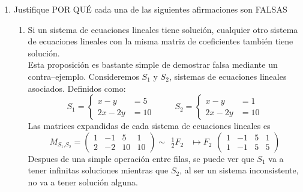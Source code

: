 \documentclass{article}
\begin{document}
\begin{enumerate}
    \item Justifique POR QUÉ cada una de las siguientes afirmaciones son FALSAS
        \begin{enumerate}[label=\listAlph]
			\item Si un sistema de ecuaciones lineales tiene solución, cualquier otro sistema de ecuaciones lineales con la misma matriz de coeficientes también tiene solución. \\
                Esta proposición es bastante simple de demostrar falsa mediante un contra--ejemplo.
                Consideremos \(S_1\) y \(S_2\), sistemas de ecuaciones lineales asociados. Definidos como:
                \[
                    S_1 =
                    \left\{
                        \begin{aligned}
                            x - y &= 5 \\
                            2x - 2y &= 10
                        \end{aligned}
                    \right.
                    \hspace{1cm}
                    S_2 =
                    \left\{
                        \begin{aligned}
                            x - y &= 1 \\
                            2x - 2y &= 10
                        \end{aligned}
                    \right.
                \]
                Las matrices expandidas de cada sistema de ecuaciones lineales es
                \[
                    M_{S_1\text{,}S_2} =
                    \left(
                    \begin{array}{cc|cc}
                        1 & -1 & 5  & 1 \\
                        2 & -2 & 10 & 10
                    \end{array}
                    \right)
                    \sim
                    \begin{aligned}
                        \frac{1}{2}F_2 &\mapsto F_2
                    \end{aligned}
                    \left(
                    \begin{array}{cc|cc}
                        1 & -1 & 5  & 1 \\
                        1 & -1 & 5  & 5
                    \end{array}
                    \right)
                \]
                Despues de una simple operación entre filas, se puede ver que \(S_1\) va a tener infinitas soluciones mientras que 
                \(S_2\), al ser un sistema inconsistente, no va a tener solución alguna.


\end{enumerate}
\end{enumerate}
\end{document}
